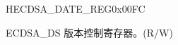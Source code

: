 \begin{register}{H}{ECDSA\_DATE\_REG}{0x00FC}\label{regdesc:ECDSADATEREG}
%
%
\regnewline%
\begin{regdesc}\begin{reglist}
\label{fielddesc:ECDSADATE}\item [ECDSA\_DATE] ECDSA\_DS 版本控制寄存器。(R/W)
\end{reglist}\end{regdesc}
\end{register}
